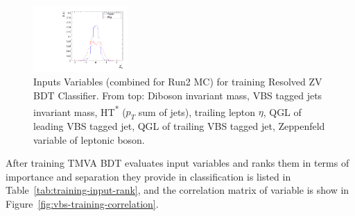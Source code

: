 \begin{figure}[!ht]
  \includegraphics[width=0.32\textwidth]{analysis_plots/tmva_plots/zjj_BDTG14_zeppLep_deta.pdf}
  \caption[Inputs Variables for training Resolved ZV BDT Classifier]%
  {Inputs Variables (combined for Run2 MC) for training Resolved ZV BDT Classifier.
    From top: Diboson invariant mass, VBS tagged jets invariant mass,
    HT\textsuperscript{*} (\( p_{T} \) sum of jets), trailing lepton \( \eta \),
    \gls{QGL} of leading VBS tagged jet,
    \gls{QGL} of trailing VBS tagged jet, Zeppenfeld variable of leptonic boson.}%
  \label{fig:vbs-training-input-zjj}
\end{figure}

After training \gls{TMVA} \gls{BDT} evaluates input variables
and ranks them in terms of importance and separation
they provide in classification is listed in Table~\ref{tab:training-input-rank},
and the correlation matrix of variable is show in Figure~\ref{fig:vbs-training-correlation}.


